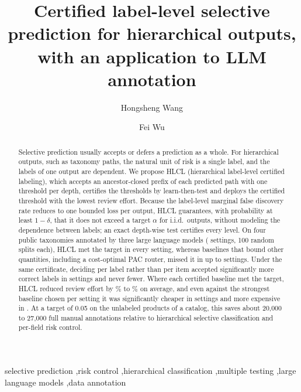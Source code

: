 \documentclass[preprint,12pt]{elsarticle}
\theoremstyle{definition}
\newcommand{\hlcl}{\textup{\textsc{HLCL}}}
\begin{document}
\begin{frontmatter}

\title{Certified label-level selective prediction for hierarchical outputs, with an application to LLM annotation}

\author[zju,loctek]{Hongsheng Wang}
\author[zju]{Fei Wu}


\begin{abstract}
Selective prediction usually accepts or defers a prediction as a whole. For
hierarchical outputs, such as taxonomy paths, the natural unit of risk is a
single label, and the labels of one output are dependent. We propose \hlcl{}
(hierarchical label-level certified labeling), which accepts an ancestor-closed
prefix of each predicted path with one threshold per depth, certifies the
thresholds by learn-then-test and deploys the certified threshold with the
lowest review effort. Because the label-level marginal false discovery rate
reduces to one bounded loss per output, \hlcl{} guarantees, with probability at
least $1-\delta$, that it does not exceed a target $\alpha$ for i.i.d.\ outputs,
without modeling the dependence between labels; an exact depth-wise test
certifies every level. On four public taxonomies annotated by three large
language models ( settings, 100 random splits each), \hlcl{}
met the target in every setting, whereas baselines that bound other
quantities, including a cost-optimal PAC router, missed it in up to
 settings. Under the same certificate, deciding per label
rather than per item accepted significantly more correct labels in
 settings and never fewer. Where each certified
baseline met the target, \hlcl{} reduced review effort by
\% to \% on average, and even against the
strongest baseline chosen per setting it was significantly cheaper in
 settings and more expensive in . At a target of
0.05 on the  unlabeled products of a catalog, this saves
about 20,000 to 27,000 full manual annotations relative to hierarchical
selective classification and per-field risk control.
\end{abstract}

\begin{keyword}
selective prediction
\sep risk control
\sep hierarchical classification
\sep multiple testing
\sep large language models
\sep data annotation
\end{keyword}

\end{frontmatter}
\end{document}
